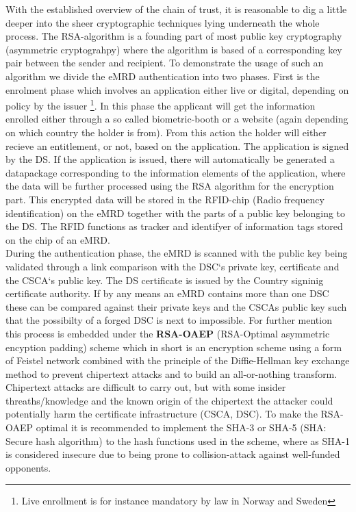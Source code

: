 \documentclass[12pt,
               a4paper,
               article,
               oneside,
               oldfontcommands,
               english]{memoir}
\begin{document}
With the established overview of the chain of trust, it is reasonable to dig a little deeper into the sheer cryptographic techniques lying underneath the whole process. The RSA-algorithm is a founding part of most public key cryptography (asymmetric cryptograhpy) where the algorithm is based of a corresponding key pair between the sender and recipient. To demonstrate the usage of such an algorithm we divide the eMRD authentication into two phases. First is the enrolment phase which involves an application either live or digital, depending on policy by the issuer \footnote{Live enrollment is for instance mandatory by law in Norway and Sweden}. In this phase the applicant will get the information  enrolled either through a so called biometric-booth or a website (again depending on which country the holder is from). From this action the holder will either recieve an entitlement, or not, based on the application. The application is signed by the DS. If the application is issued, there will automatically be generated a datapackage corresponding to the information elements of the application, where the data will be further processed using the RSA algorithm for the encryption part. This encrypted data will be stored in the RFID-chip (Radio frequency identification) on the eMRD together with the parts of a public key belonging to the DS. The RFID functions as tracker and identifyer of information tags stored on the chip of an eMRD. \vspace{4mm}\\
During the authentication phase, the eMRD is scanned with the public key being validated through a link comparison with the DSC`s private key, certificate and the CSCA`s public key. The DS certificate is issued by the Country signinig certificate authority. If by any means an eMRD contains more than one DSC these can be compared against their private keys and the CSCAs public key such that the possibilty of a forged DSC is next to impossible. For further mention this process is embedded under the \textbf{RSA-OAEP} (RSA-Optimal asymmetric encyption padding) scheme which in short is an encryption scheme using a form of Feistel network combined with the principle of the Diffie-Hellman key exchange method to prevent chipertext attacks and to build an all-or-nothing transform. Chipertext attacks are difficult to carry out, but with some insider threaths/knowledge and the known origin of the chipertext the attacker could potentially harm the certificate infrastructure (CSCA, DSC). To make the RSA-OAEP optimal it is recommended to implement the SHA-3 or SHA-5 (SHA: Secure hash algorithm) to the hash functions used in the scheme, where as SHA-1 is considered insecure due to being prone to collision-attack against well-funded opponents\cite{OAEP}. \vspace{4mm}\\
\end{document}
